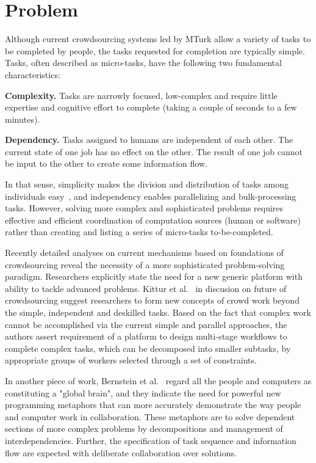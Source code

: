 \section{Problem}
\label{Int.Problem}

Although current crowdsourcing systems led by MTurk allow a variety of tasks 
to be completed by people, the tasks requested for completion are typically simple. 
Tasks, often described as micro-tasks, have the following two fundamental characteristics:

\textbf{Complexity.} Tasks are narrowly focused, low-complex and require 
little expertise and cognitive effort to complete (taking a couple of seconds to 
a few minutes).

\textbf{Dependency.} Tasks assigned to humans are independent of each other. 
The current state of one job has no effect on the other. The result of one job cannot 
be input to the other to create some information flow.

In that sense, simplicity makes the division and distribution of tasks among 
individuals easy~\cite{Zhang2011}, and independency enables parallelizing 
and bulk-processing tasks. However, solving more complex and sophisticated 
problems requires effective and efficient coordination of computation sources 
(human or software) rather than creating and listing a series of micro-tasks 
to-be-completed.

Recently detailed analyses on current mechanisms based on foundations of 
crowdsourcing reveal the necessity of a more sophisticated problem-solving 
paradigm. Researchers explicitly state the need for a new generic platform 
with ability to tackle advanced problems. Kittur et al.~\cite{Kittur2013} in discusion on future of 
crowdsourcing suggest researchers to form new concepts of crowd work beyond 
the simple, independent and deskilled tasks. Based on the fact that complex 
work cannot be accomplished via the current simple and parallel approaches, 
the authors assert requirement of a platform to design multi-stage workflows 
to complete complex tasks, which can be decomposed into smaller subtasks, 
by appropriate groups of workers selected through a set of constraints.

In another piece of work, Bernstein et al.~\cite{Bernstein2012} regard all the 
people and computers as constituting a "global brain", and they indicate the 
need for powerful new programming metaphors that can more accurately 
demonstrate the way people and computer work in collaboration. These 
metaphors are to solve dependent sections of more complex problems by 
decompositions and management of interdependencies. Further, the specification 
of task sequence and information flow are expected with deliberate collaboration 
over solutions.

